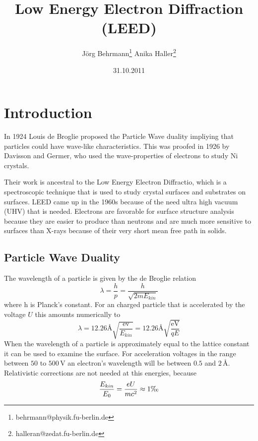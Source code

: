 \documentclass[a4paper,10pt]{scrartcl}
\begin{document}
\title{Low Energy Electron Diffraction (LEED)}
\author{J\"org Behrmann\footnote{behrmann@physik.fu-berlin.de} \qquad Anika Haller\footnote{halleran@zedat.fu-berlin.de}}
\date{31.10.2011}
\maketitle
\tableofcontents
\thispagestyle{empty}

\section{Introduction}

In 1924 Louis de Broglie proposed the Particle Wave duality impliying that particles could have wave-like characteristics. This was proofed in 1926 by Davisson and Germer, who used the wave-properties of electrons to study Ni crystals. 

Their work is ancestral to the Low Energy Electron Diffractio, which is a spectroscopic technique that is used to study crystal surfaces and substrates on surfaces. LEED came up in the 1960s because of the need ultra high vacuum (UHV) that is needed. Electrons are favorable for surface structure analysis because they are easier to produce than neutrons and are much more sensitive to surfaces than X-rays because of their very short mean free path in solids.

\subsection{Particle Wave Duality}

The wavelength of a particle is given by the de Broglie relation
\begin{equation}
\lambda = \frac{h}{p} = \frac{h}{\sqrt{2mE_{kin}}} \label{eq:broglie1}
\end{equation}
where h is Planck's constant. For an charged particle that is accelerated by the voltage $U$ this amounts numerically to
\begin{equation}
\lambda = 12.26 \mbox{\AA} \sqrt{\frac{\mbox{ev}}{E_{kin}}} = 12.26 \mbox{\AA} \sqrt{\frac{\mbox{eV}}{qE}} \label{eq:broglie}
\end{equation}
When the wavelength of a particle is approximately equal to the lattice constant it can be used to examine the surface. For acceleration voltages in the range between $50$ to $500\,$V an electron's wavelength will be between $0.5$ and $2\,$\AA. Relativistic corrections are not needed at this energies, because 
\begin{equation}
\frac{E_{kin}}{E_0}=\frac{eU}{mc^2} \approx 1\mbox{\textperthousand}
\end{equation}
\end{document}
